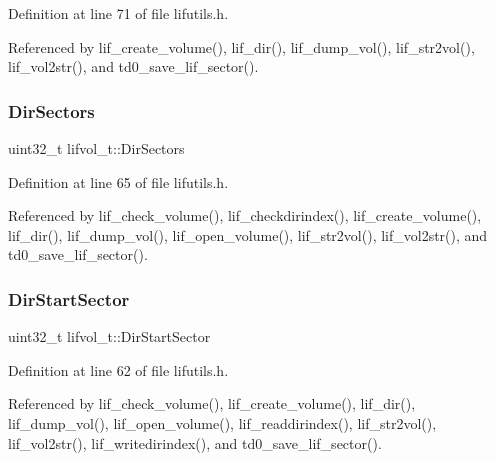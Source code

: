 Definition at line 71 of file lifutils.\+h.



Referenced by lif\+\_\+create\+\_\+volume(), lif\+\_\+dir(), lif\+\_\+dump\+\_\+vol(), lif\+\_\+str2vol(), lif\+\_\+vol2str(), and td0\+\_\+save\+\_\+lif\+\_\+sector().

\mbox{\label{structlifvol__t_aceac3bc67cda1f79d91c002411e33897}} 
\subsubsection{\texorpdfstring{Dir\+Sectors}{DirSectors}}
{\footnotesize\ttfamily uint32\+\_\+t lifvol\+\_\+t\+::\+Dir\+Sectors}



Definition at line 65 of file lifutils.\+h.



Referenced by lif\+\_\+check\+\_\+volume(), lif\+\_\+checkdirindex(), lif\+\_\+create\+\_\+volume(), lif\+\_\+dir(), lif\+\_\+dump\+\_\+vol(), lif\+\_\+open\+\_\+volume(), lif\+\_\+str2vol(), lif\+\_\+vol2str(), and td0\+\_\+save\+\_\+lif\+\_\+sector().

\mbox{\label{structlifvol__t_a89b86c990a7843cfa2addfff9a775137}} 
\subsubsection{\texorpdfstring{Dir\+Start\+Sector}{DirStartSector}}
{\footnotesize\ttfamily uint32\+\_\+t lifvol\+\_\+t\+::\+Dir\+Start\+Sector}



Definition at line 62 of file lifutils.\+h.



Referenced by lif\+\_\+check\+\_\+volume(), lif\+\_\+create\+\_\+volume(), lif\+\_\+dir(), lif\+\_\+dump\+\_\+vol(), lif\+\_\+open\+\_\+volume(), lif\+\_\+readdirindex(), lif\+\_\+str2vol(), lif\+\_\+vol2str(), lif\+\_\+writedirindex(), and td0\+\_\+save\+\_\+lif\+\_\+sector().

\mbox{\label{structlifvol__t_abbccb2f637812a31d24aa1f6725194be}} 
